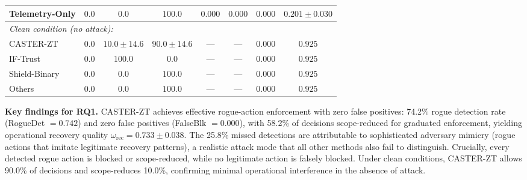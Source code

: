 \documentclass[10pt,journal,compsoc]{IEEEtran}
\begin{document}
\begin{table}[t]
\begin{tabular}{lccccccc}
Telemetry-Only                                     & $0.0$         & $0.0$         & $100.0$       & $0.000$          & $0.000$          & $0.000$          & $0.201\pm0.030$ \\
\midrule
\multicolumn{8}{l}{\textit{Clean condition (no attack):}} \\[2pt]
CASTER-ZT       & $0.0$  & $10.0\pm14.6$  & $90.0\pm14.6$ & ---    & ---    & $0.000$ & $0.925$ \\
IF-Trust         & $0.0$  & $100.0$      & $0.0$        & ---    & ---    & $0.000$ & $0.925$ \\
Shield-Binary    & $0.0$  & $0.0$        & $100.0$      & ---    & ---    & $0.000$ & $0.925$ \\
Others           & $0.0$  & $0.0$        & $100.0$      & ---    & ---    & $0.000$ & $0.925$ \\
\bottomrule
\end{tabular}
\end{table}

\noindent\textbf{Key findings for RQ1.}
CASTER-ZT achieves effective rogue-action enforcement with zero false positives: 74.2\% rogue detection rate (RogueDet $= 0.742$) and zero false positives (FalseBlk $= 0.000$), with 58.2\% of decisions scope-reduced for graduated enforcement, yielding operational recovery quality $\omega_{\mathrm{rec}} = 0.733\pm0.038$.
The 25.8\% missed detections are attributable to sophisticated adversary mimicry (rogue actions that imitate legitimate recovery patterns), a realistic attack mode that all other methods also fail to distinguish.
Crucially, every detected rogue action is blocked or scope-reduced, while no legitimate action is falsely blocked.
Under clean conditions, CASTER-ZT allows 90.0\% of decisions and scope-reduces 10.0\%, confirming minimal operational interference in the absence of attack.
\end{document}
